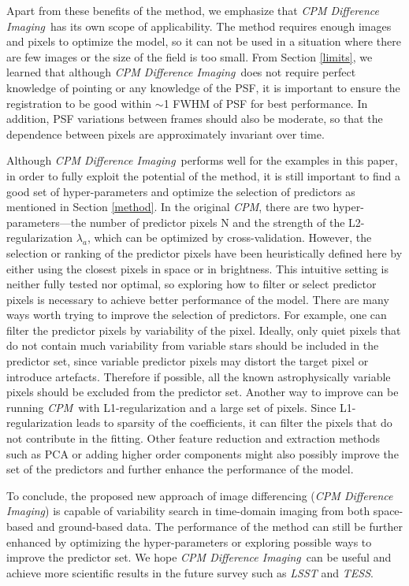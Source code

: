 \documentclass[12pt, preprint]{aastex}
\newcommand{\project}[1]{\textsl{#1}}
\newcommand{\cpm}{\project{CPM}}
\newcommand{\cpmdiff}{\project{CPM Difference Imaging}}
\begin{document}
Apart from these benefits of the method, we emphasize that \cpmdiff\ has its own scope of applicability.
The method requires enough images and pixels to optimize the model, so it can not be used in a situation where there are few images or the size of the field is too small. 
From Section \ref{limits}, we learned that although \cpmdiff\ does not require perfect knowledge of pointing or any knowledge of the PSF, it is important to ensure the registration to be good within $\sim$1 FWHM of PSF for best performance.
In addition, PSF variations between frames should also be moderate, so that the dependence between pixels are approximately invariant over time.

Although \cpmdiff\ performs well for the examples in this paper,  in order to fully exploit the potential of the method, it is still important to find a good set of hyper-parameters and optimize the selection of predictors as mentioned in Section \ref{method}. 
In the original \cpm, there are two hyper-parameters---the number of predictor pixels N and the strength of the L2-regularization $\lambda_a$, which can be optimized by cross-validation. 
However, the selection or ranking of the predictor pixels have been heuristically defined here by either using the closest pixels in space or in brightness.
This intuitive setting is neither fully tested nor optimal, so exploring how to filter or select predictor pixels is necessary to achieve better performance of the model.
There are many ways worth trying to improve the selection of predictors.
For example, one can filter the predictor pixels by variability of the pixel.
Ideally, only quiet pixels that do not contain much variability from variable stars should be included in the predictor set, since variable predictor pixels may distort the target pixel or introduce artefacts.
Therefore if possible, all the known astrophysically variable pixels should be excluded from the predictor set. 
Another way to improve can be running \cpm\ with L1-regularization and a large set of pixels. 
Since L1-regularization leads to sparsity of the coefficients, it can filter the pixels that do not contribute in the fitting. 
Other feature reduction and extraction methods such as PCA or adding higher order components might also possibly improve the set of the predictors and further enhance the performance of the model. 

To conclude, the proposed new approach of image differencing (\cpmdiff) is capable of variability search in time-domain imaging from both space-based and ground-based data.
The performance of the method can still be further enhanced by optimizing the hyper-parameters or exploring possible ways to improve the predictor set.
We hope \cpmdiff\ can be useful and achieve more scientific results in the future survey such as \project{LSST} and \project{TESS}.
\end{document}
